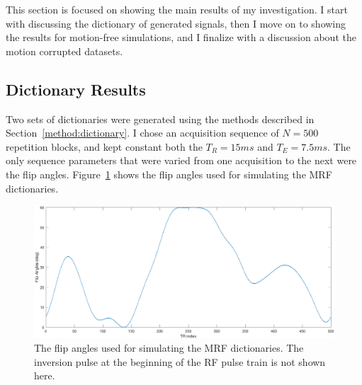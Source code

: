 
This section is focused on showing the main results of my investigation.
I start with discussing the dictionary of generated signals, 
then I move on to showing the results for motion-free simulations,
and I finalize with a discussion about the motion corrupted datasets.

\subsection{Dictionary Results}

Two sets of dictionaries were generated using the methods described in Section~\ref{method:dictionary}.
I chose an acquisition sequence of $N = 500$ repetition blocks, and kept constant both the $T_R = 15ms$ and $T_E = 7.5ms$.
The only sequence parameters that were varied from one acquisition to the next were the flip angles.
Figure~\ref{fig:FAsMaryia} shows the flip angles used for simulating the MRF dictionaries. 

\begin{figure}[ht]
    \centering
    \includegraphics[width=1\textwidth]{images/mrf/FAsMaryia}
    \caption{The flip angles used for simulating the MRF dictionaries.
    The inversion pulse at the beginning of the RF pulse train is not shown here.}
    \label{fig:FAsMaryia}
\end{figure}

\hfill

